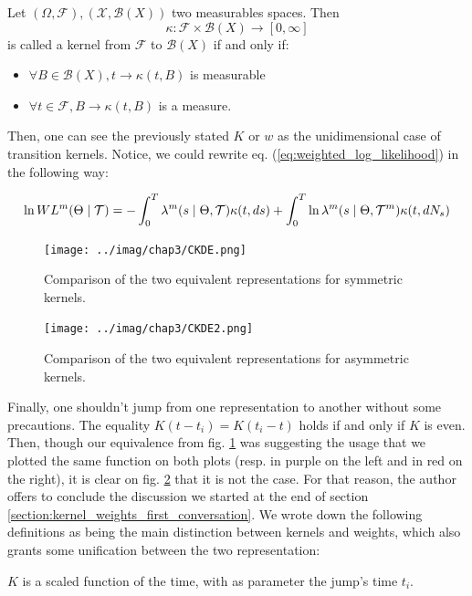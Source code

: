 \documentclass[11pt]{book}
\begin{document}
\begin{definition}
Let $(\Omega, \mathcal F), ( \mathcal X, \mathcal B (X) )$ two measurables spaces. Then $$ \kappa : \mathcal F \times \mathcal B (X) \to [0, \infty] $$ is called a kernel from $\mathcal F$ to $\mathcal B(X)$ if and only if:

\begin{itemize}
\setlength{\itemindent}{3. cm}
\item $\forall B \in \mathcal B(X), t \to \kappa(  t, B)$ is measurable
\item $\forall t \in \mathcal F, B \to \kappa(  t, B)$ is a measure.
\end{itemize}
\end{definition}

Then, one can see the previously stated $K$ or $w$ as the unidimensional case of transition kernels. Notice, we could rewrite eq. (\ref{eq:weighted_log_likelihood}) in the following way:

$$ \ln W L^m( \Theta \mid \mathcal{T} ) = - \int_0^T \lambda^{m} ( s \mid \Theta , \mathcal{T} ) \kappa(t, ds) + \int_0^T \ln \lambda^{m} ( s \mid \Theta , \mathcal{T}^m ) \kappa(t, d N_s)  $$

\begin{figure}
\centering
\texttt{[image: ../imag/chap3/CKDE.png]}
\caption{Comparison of the two equivalent representations for symmetric kernels.}
\label{fig:CKDE}
\end{figure}

\begin{figure}
\centering
\texttt{[image: ../imag/chap3/CKDE2.png]}
\caption{Comparison of the two equivalent representations for asymmetric kernels.}
\label{fig:CKDE2}
\end{figure}


\newpage 
Finally, one shouldn't jump from one representation to another without some precautions. The equality $K(t - t_i) = K(t_i - t)$ holds if and only if $K$ is even. Then, though our equivalence from fig. \ref{fig:CKDE} was suggesting the usage that we plotted the same function on both plots (resp. in purple on the left and in red on the right), it is clear on fig. \ref{fig:CKDE2} that it is not the case. For that reason, the author offers to conclude the discussion we started at the end of section \ref{section:kernel_weights_first_conversation}. We wrote down the following definitions as being the main distinction between kernels and weights, which also grants some unification between the two representation:
\begin{definition}[Kernel]
$K$ is a scaled function of the time, with as parameter the jump's time $t_i$.
\end{definition}
\end{document}
